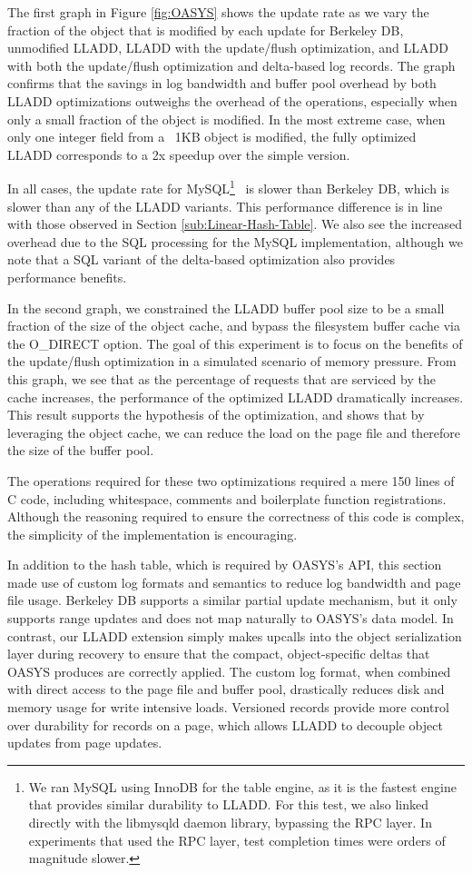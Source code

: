 \documentclass[10pt,letterpaper,twocolumn,english]{article}
\newcommand{\yad}{LLADD\xspace}
\newcommand{\oasys}{OASYS\xspace}
\begin{document}
The first graph in Figure \ref{fig:OASYS} shows the update rate as we
vary the fraction of the object that is modified by each update for
Berkeley DB, unmodified \yad, \yad with the update/flush optimization,
and \yad with both the update/flush optimization and delta-based log
records.
The graph confirms that the savings in log bandwidth and
buffer pool overhead by both \yad optimizations 
outweighs the overhead of the operations, especially when only a small
fraction of the object is modified.
In the most extreme case, when
only one integer field from a ~1KB object is modified, the fully
optimized \yad corresponds to a 2x speedup over the simple version.

In all cases, the update rate for MySQL\footnote{We ran MySQL using
InnoDB for the table engine, as it is the fastest engine that provides
similar durability to \yad. For this test, we also linked directly
with the libmysqld daemon library, bypassing the RPC layer. In
experiments that used the RPC layer, test completion times were orders
of magnitude slower.}~\cite{mysql} is slower than Berkeley DB,
which is slower than any of the \yad variants. This performance
difference is in line with those observed in Section
\ref{sub:Linear-Hash-Table}. We also see the increased overhead due to
the SQL processing for the MySQL implementation, although we note that
a SQL variant of the delta-based optimization also provides performance
benefits.

In the second graph, we constrained the \yad buffer pool size to be a
small fraction of the size of the object cache, and bypass the filesystem
buffer cache via the O\_DIRECT option. The goal of this experiment is to
focus on the benefits of the update/flush optimization in a simulated
scenario of memory pressure. From this graph, we see that as the percentage of
requests that are serviced by the cache increases, the
performance of the optimized \yad dramatically increases.
This result supports the hypothesis of the optimization, and
shows that by leveraging the object cache, we can reduce the load on
the page file and therefore the size of the buffer pool.

The operations required for these
two optimizations required a mere 150 lines of C code, including
whitespace, comments and boilerplate function registrations.  Although
the reasoning required to ensure the correctness of this code is
complex, the simplicity of the implementation is encouraging.

In addition to the hash table, which is required by \oasys's API, this
section made use of custom log formats and semantics to reduce log
bandwidth and page file usage.  Berkeley DB supports a similar
partial update mechanism, but it only
supports range updates and does not map naturally to \oasys's data
model.  In contrast, our \yad extension simply makes upcalls
into the object serialization layer during recovery to ensure that the
compact, object-specific deltas that \oasys produces are correctly
applied.  The custom log format, when combined with direct access to
the page file and buffer pool, drastically reduces disk and memory usage
for write intensive loads.
Versioned records provide more control over durability for
records on a page, which allows \yad to decouple object updates from page
updates.
\end{document}
